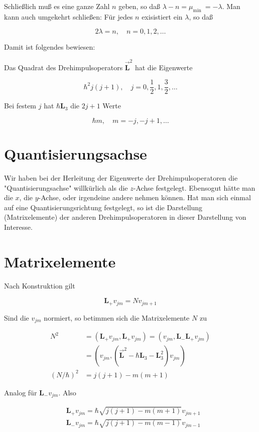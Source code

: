 \documentclass[10pt, letterpaper]{article}
\begin{document}
Schließlich muß es eine ganze Zahl $n$ geben, so daß $\lambda-n=\mu_{\text {min }}=-\lambda$. Man kann auch umgekehrt schließen: Für jedes $n$ exisistiert ein $\lambda$, so daß

$$
2 \lambda=n, \quad n=0,1,2, \ldots
$$

Damit ist folgendes bewiesen:

Das Quadrat des Drehimpulsoperators $\overrightarrow{\mathbf{L}}^{2}$ hat die Eigenwerte

$$
\hbar^{2} j(j+1), \quad j=0, \frac{1}{2}, 1, \frac{3}{2}, \ldots
$$

Bei festem $j$ hat $\hbar \mathbf{L}_{3}$ die $2 j+1$ Werte

$$
\hbar m, \quad m=-j,-j+1, \ldots
$$

\section*{Quantisierungsachse}
Wir haben bei der Herleitung der Eigenwerte der Drehimpulsoperatoren die "Quantisierungsachse" willkürlich als die $z$-Achse festgelegt. Ebensogut hätte man die $x$, die $y$-Achse, oder irgendeine andere nehmen können. Hat man sich einmal auf eine Quantisierungsrichtung festgelegt, so ist die Darstellung (Matrixelemente) der anderen Drehimpulsoperatoren in dieser Darstellung von Interesse.

\section*{Matrixelemente}
Nach Konstruktion gilt

$$
\mathbf{L}_{+} v_{j m}=N v_{j m+1}
$$

Sind die $v_{j m}$ normiert, so betimmen sich die Matrixelemente $N$ zu

$$
\begin{aligned}
N^{2} & =\left(\mathbf{L}_{+} v_{j m}, \mathbf{L}_{+} v_{j m}\right)=\left(v_{j m}, \mathbf{L}_{-} \mathbf{L}_{+} v_{j m}\right) \\
& =\left(v_{j m},\left(\overrightarrow{\mathbf{L}}^{2}-\hbar \mathbf{L}_{3}-\mathbf{L}_{3}^{2}\right) v_{j m}\right) \\
(N / \hbar)^{2} & =j(j+1)-m(m+1)
\end{aligned}
$$

Analog für $\mathbf{L}_{-} v_{j m}$. Also

$$
\begin{aligned}
& \mathbf{L}_{+} v_{j m}=\hbar \sqrt{j(j+1)-m(m+1)} v_{j m+1} \\
& \mathbf{L}_{-} v_{j m}=\hbar \sqrt{j(j+1)-m(m-1)} v_{j m-1}
\end{aligned}
$$
\end{document}
